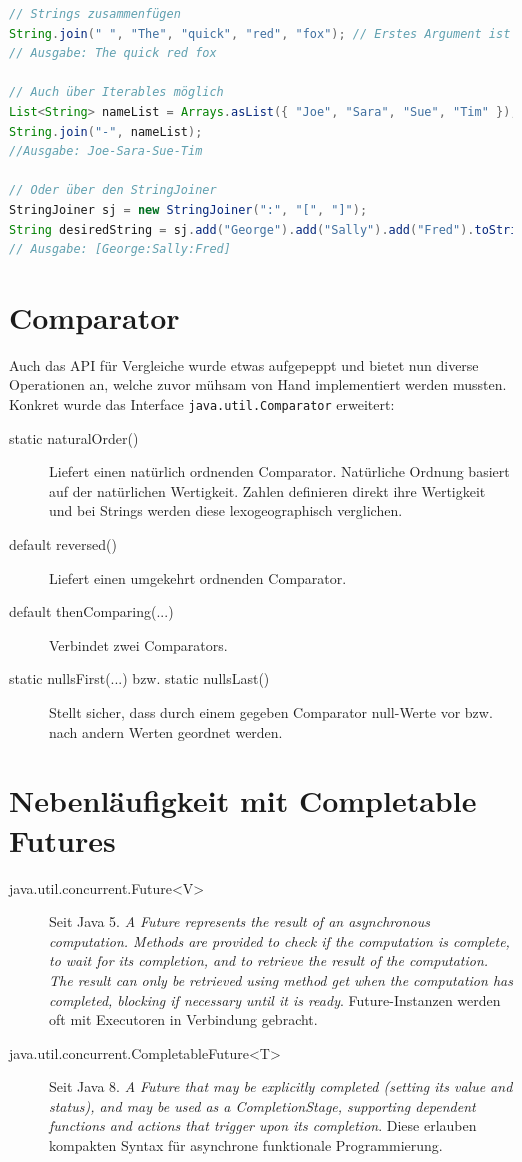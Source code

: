 \begin{lstlisting}[language=Java, caption=String]
// Strings zusammenfügen
String.join(" ", "The", "quick", "red", "fox"); // Erstes Argument ist delimiter
// Ausgabe: The quick red fox

// Auch über Iterables möglich
List<String> nameList = Arrays.asList({ "Joe", "Sara", "Sue", "Tim" });
String.join("-", nameList);
//Ausgabe: Joe-Sara-Sue-Tim

// Oder über den StringJoiner
StringJoiner sj = new StringJoiner(":", "[", "]");
String desiredString = sj.add("George").add("Sally").add("Fred").toString();
// Ausgabe: [George:Sally:Fred]
\end{lstlisting}

\section{Comparator}
Auch das API für Vergleiche wurde etwas aufgepeppt und bietet nun diverse Operationen an, welche zuvor mühsam von Hand implementiert werden mussten. Konkret wurde das Interface \verb|java.util.Comparator| erweitert:

\begin{description}
	\item[static naturalOrder()] Liefert einen natürlich ordnenden Comparator. Natürliche Ordnung basiert auf der natürlichen Wertigkeit. Zahlen definieren direkt ihre Wertigkeit und bei Strings werden diese lexogeographisch verglichen.
	\item[default reversed()] Liefert einen umgekehrt ordnenden Comparator.
	\item[default thenComparing(...)] Verbindet zwei Comparators.
	\item[static nullsFirst(...) bzw. static nullsLast()] Stellt sicher, dass durch einem gegeben Comparator null-Werte vor bzw. nach andern Werten geordnet werden.
\end{description}

\section{Nebenläufigkeit mit Completable Futures}
\begin{description}
	\item[java.util.concurrent.Future<V>] Seit Java 5. \emph{A Future represents the result of an	asynchronous computation. Methods are provided to	check if the computation is complete, to wait for its completion, and to retrieve the result of the computation. The result can only be retrieved using method get when the computation has completed, blocking if necessary until it is ready}. Future-Instanzen werden oft mit Executoren in Verbindung gebracht.
	\item[java.util.concurrent.CompletableFuture<T>] Seit Java 8. \emph{A Future that may be explicitly completed (setting its value and status), and may be used as a 	CompletionStage, supporting dependent functions and actions that trigger upon its completion}. Diese erlauben kompakten Syntax für asynchrone funktionale Programmierung.
\end{description}

